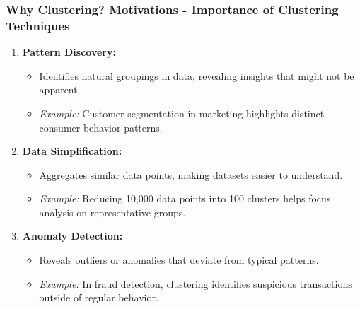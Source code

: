 \documentclass[aspectratio=169]{beamer}
\begin{document}
\begin{frame}[fragile]
    \frametitle{Why Clustering? Motivations - Importance of Clustering Techniques}
    \begin{enumerate}
        \item \textbf{Pattern Discovery:}
            \begin{itemize}
                \item Identifies natural groupings in data, revealing insights that might not be apparent.
                \item \textit{Example:} Customer segmentation in marketing highlights distinct consumer behavior patterns.
            \end{itemize}
        \item \textbf{Data Simplification:}
            \begin{itemize}
                \item Aggregates similar data points, making datasets easier to understand.
                \item \textit{Example:} Reducing 10,000 data points into 100 clusters helps focus analysis on representative groups.
            \end{itemize}
        \item \textbf{Anomaly Detection:}
            \begin{itemize}
                \item Reveals outliers or anomalies that deviate from typical patterns.
                \item \textit{Example:} In fraud detection, clustering identifies suspicious transactions outside of regular behavior.
            \end{itemize}
    \end{enumerate}
\end{frame}
\end{document}
